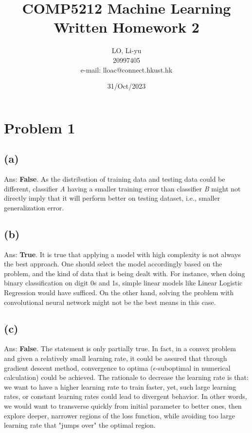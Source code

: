 \documentclass[a4paper,12pt]{article}
\begin{document}
%
   \title{\textbf{COMP5212 Machine Learning}  \\
   Written Homework 2}
      
   \author{LO, Li-yu \\ 20997405 \\ e-mail: lloac@connect.hkust.hk}
          
   \date{31/Oct/2023}

   \maketitle

   
\section*{Problem 1}

\subsection*{(a)}
\noindent Ans: \textbf{False}. As the distribution of training data and testing data 
could be different, classifier \textit{A} having a smaller training error than classifier \textit{B}
might not directly imply that it will perform better on testing dataset, i.e., 
smaller generalization error.

\subsection*{(b)}
\noindent Ans: \textbf{True}. It is true that applying a model with high complexity is not 
always the best approach. One should select the model accordingly based on the problem, and
the kind of data that is being dealt with. For instance, when doing binary classification
on digit 0s and 1s, simple linear models like Linear Logistic Regression would have sufficed.
On the other hand, solving the problem with convolutional neural network might not 
be the best means in this case.

\subsection*{(c)}
\noindent Ans: \textbf{False}. The statement is only partially true. 
In fact, in a convex problem and given a relatively small learning rate, it could be assured
that through gradient descent method, convergence to optima ($\epsilon$-suboptimal in numerical calculation) 
could be achieved. The rationale to decrease the learning rate is that:
we want to have a higher learning rate to train faster, yet, such large learning rates, or 
constant learning rates could lead to divergent behavior. 
In other words, we would want to transverse quickly from initial parameter to better ones,
then explore deeper, narrower regions of the loss function, while avoiding too large 
learning rate that "jumps over" the optimal region.
\end{document}

